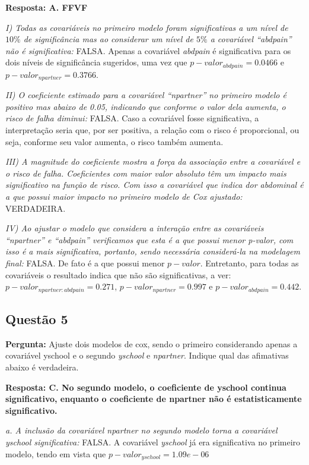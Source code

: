 \documentclass[a4paper,12pt]{article}
\begin{document}
\textbf{Resposta: A. FFVF}

\textit{I) Todas as covariáveis no primeiro modelo foram significativas a um nível de $10\%$ de significância mas ao considerar um nível de $5\%$ a covariável “abdpain” não é significativa:} FALSA. Apenas a covariável \textit{abdpain} é significativa para os dois níveis de significância sugeridos, uma vez que $p-valor_{abdpain} = 0.0466$ e $p-valor_{npartner} = 0.3766$.

\textit{II) O coeficiente estimado para a covariável “npartner” no primeiro modelo é positivo mas abaixo de 0.05, indicando que conforme o valor dela aumenta, o risco de falha diminui:} FALSA. Caso a covariável fosse significativa, a interpretação seria que, por ser positiva, a relação com o risco é proporcional, ou seja, conforme seu valor aumenta, o risco também aumenta.


\textit{III) A magnitude do coeficiente mostra a força da associação entre a covariável e o risco de falha. Coeficientes com maior valor absoluto têm um impacto mais significativo na função de risco. Com isso a covariável que indica dor abdominal é a que possui maior impacto no primeiro modelo de Cox ajustado:} VERDADEIRA.

\textit{IV) Ao ajustar o modelo que considera a interação entre as covariáveis “npartner” e “abdpain” verificamos que esta é a que possui menor p-valor, com isso é a mais significativa, portanto, sendo necessária considerá-la na modelagem final:} FALSA. De fato é a que possui menor $p-valor$. Entretanto, para todas as covariáveis o resultado indica que não são significativas, a ver: $p-valor_{npartner:abdpain} = 0.271$, $p-valor_{npartner} = 0.997$ e $p-valor_{abdpain} = 0.442$.



\subsection{Questão 5}
\textbf{Pergunta:} Ajuste dois modelos de cox, sendo o primeiro considerando apenas a covariável yschool e o segundo \textit{yschool} e \textit{npartner}. Indique qual das afimativas abaixo é verdadeira.

\textbf{Resposta: C. No segundo modelo, o coeficiente de yschool continua significativo, enquanto o coeficiente de npartner não é estatisticamente significativo.
}

\textit{a. A inclusão da covariável npartner no segundo modelo torna a covariável yschool significativa:} FALSA. A covariável \textit{yschool} já era significativa no primeiro modelo, tendo em vista que $p-valor_{yschool} = 1.09e-06$
\end{document}
